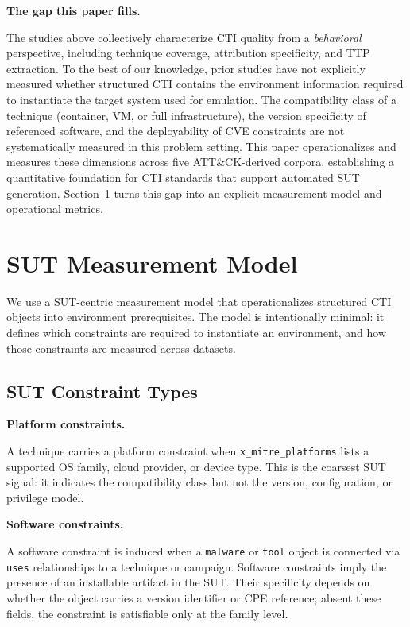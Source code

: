 \documentclass[sigconf,anonymous,review]{acmart}
\newcommand{\myparagraph}[1]{\textbf{#1.}\hspace{0.5em}}
\begin{document}
\myparagraph{The gap this paper fills}

The studies above collectively characterize CTI quality from a \emph{behavioral} perspective, including technique coverage, attribution specificity, and TTP extraction. To the best of our knowledge, prior studies have not explicitly measured whether structured CTI contains the environment information required to instantiate the target system used for emulation. The compatibility class of a technique (container, VM, or full infrastructure), the version specificity of referenced software, and the deployability of CVE constraints are not systematically measured in this problem setting. This paper operationalizes and measures these dimensions across five ATT\&CK-derived corpora, establishing a quantitative foundation for CTI standards that support automated SUT generation. Section~\ref{sec:definitions} turns this gap into an explicit measurement model and operational metrics.


\section{SUT Measurement Model}\label{sec:definitions}

We use a SUT-centric measurement model that operationalizes structured CTI objects into environment prerequisites. The model is intentionally minimal: it defines which constraints are required to instantiate an environment, and how those constraints are measured across datasets.

\subsection{SUT Constraint Types}

\myparagraph{Platform constraints}

A technique carries a platform constraint when \texttt{x\_mitre\_platforms} lists a supported OS family, cloud provider, or device type. This is the coarsest SUT signal: it indicates the compatibility class but not the version, configuration, or privilege model.

\myparagraph{Software constraints}

A software constraint is induced when a \texttt{malware} or \texttt{tool} object is connected via \texttt{uses} relationships to a technique or campaign. Software constraints imply the presence of an installable artifact in the SUT\@. Their specificity depends on whether the object carries a version identifier or CPE reference; absent these fields, the constraint is satisfiable only at the family level.
\end{document}
